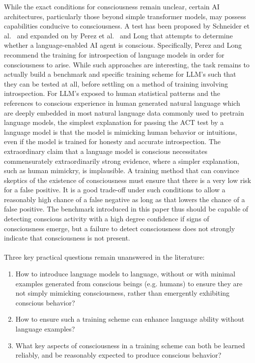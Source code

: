 \documentclass{article}
\begin{document}
While the exact conditions for consciousness remain unclear, certain AI architectures, particularly those beyond simple transformer models, may possess capabilities conducive to consciousness. A test has been proposed by Schneider et al.\ \citep{turner2018testing} and expanded on by Perez et al.\ \citep{perez2023evaluatingaisystemsmoral} and Long \citep{long2023introspective} that attempts to determine whether a language-enabled AI agent is conscious. Specifically, Perez and Long recommend the training for introspection of language models in order for consciousness to arise. While such approaches are interesting, the task remains to actually build a benchmark and specific training scheme for LLM's such that they can be tested at all, before settling on a method of training involving introspection. For LLM's exposed to human statistical patterns and the references to conscious experience in human generated natural language which are deeply embedded in most natural language data commonly used to pretrain language models, the simplest explanation for passing the ACT test by a language model is that the model is mimicking human behavior or intuitions, even if the model is trained for honesty and accurate introspection. The extraordinary claim that a language model is conscious necessitates commensurately extraordinarily strong evidence, where a simpler explanation, such as human mimickry, is implausible. A training method that can convince skeptics of the existence of consciousness must ensure that there is a very low risk for a false positive. It is a good trade-off under such conditions to allow a reasonably high chance of a false negative as long as that lowers the chance of a false positive. The benchmark introduced in this paper thus should be capable of detecting conscious activity with a high degree confidence if signs of consciousness emerge, but a failure to detect consciousness does not strongly indicate that consciousness is not present. \\ \\
Three key practical questions remain unanswered in the literature:
\begin{enumerate}
    \item How to introduce language models to language, without or with minimal examples generated from conscious beings (e.g. humans) to ensure they are not simply mimicking consciousness, rather than emergently exhibiting conscious behavior?
    \item How to ensure such a training scheme can enhance language ability without language examples?
    \item What key aspects of consciousness in a training scheme can both be learned reliably, and be reasonably expected to produce conscious behavior?
\end{enumerate}
\end{document}
